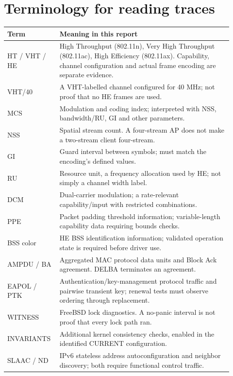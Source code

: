 \documentclass[11pt,letterpaper,oneside]{article}
\begin{document}
\clearpage
\appendix
\section{Terminology for reading traces}
\begin{longtable}{p{0.19\linewidth}p{0.73\linewidth}}\toprule Term & Meaning in this report\\\midrule\endhead
HT / VHT / HE & High Throughput (802.11n), Very High Throughput (802.11ac), High Efficiency (802.11ax). Capability, channel configuration and actual frame encoding are separate evidence.\\
VHT/40 & A VHT-labelled channel configured for 40 MHz; not proof that no HE frames are used.\\
MCS & Modulation and coding index; interpreted with NSS, bandwidth/RU, GI and other parameters.\\
NSS & Spatial stream count. A four-stream AP does not make a two-stream client four-stream.\\
GI & Guard interval between symbols; must match the encoding's defined values.\\
RU & Resource unit, a frequency allocation used by HE; not simply a channel width label.\\
DCM & Dual-carrier modulation; a rate-relevant capability/input with restricted combinations.\\
PPE & Packet padding threshold information; variable-length capability data requiring bounds checks.\\
BSS color & HE BSS identification information; validated operation state is required before driver use.\\
AMPDU / BA & Aggregated MAC protocol data units and Block Ack agreement. DELBA terminates an agreement.\\
EAPOL / PTK & Authentication/key-management protocol traffic and pairwise transient key; renewal tests must observe ordering through replacement.\\
WITNESS & FreeBSD lock diagnostics. A no-panic interval is not proof that every lock path ran.\\
INVARIANTS & Additional kernel consistency checks, enabled in the identified CURRENT configuration.\\
SLAAC / ND & IPv6 stateless address autoconfiguration and neighbor discovery; both require functional control traffic.\\\bottomrule\end{longtable}
\end{document}
